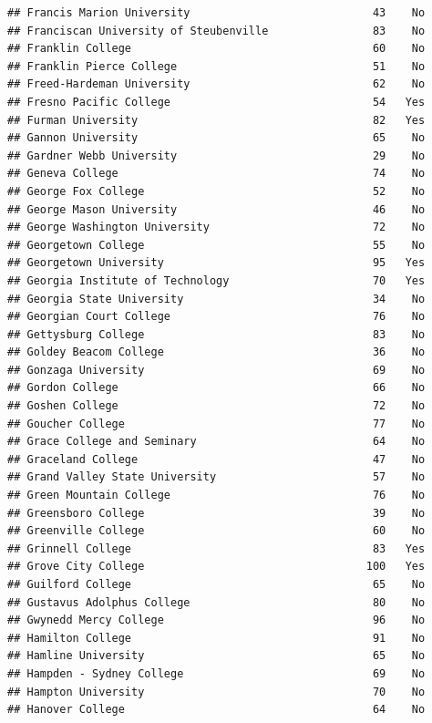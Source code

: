 \documentclass[
]{article}
\begin{document}
\begin{verbatim}
## Francis Marion University                            43    No
## Franciscan University of Steubenville                83    No
## Franklin College                                     60    No
## Franklin Pierce College                              51    No
## Freed-Hardeman University                            62    No
## Fresno Pacific College                               54   Yes
## Furman University                                    82   Yes
## Gannon University                                    65    No
## Gardner Webb University                              29    No
## Geneva College                                       74    No
## George Fox College                                   52    No
## George Mason University                              46    No
## George Washington University                         72    No
## Georgetown College                                   55    No
## Georgetown University                                95   Yes
## Georgia Institute of Technology                      70   Yes
## Georgia State University                             34    No
## Georgian Court College                               76    No
## Gettysburg College                                   83    No
## Goldey Beacom College                                36    No
## Gonzaga University                                   69    No
## Gordon College                                       66    No
## Goshen College                                       72    No
## Goucher College                                      77    No
## Grace College and Seminary                           64    No
## Graceland College                                    47    No
## Grand Valley State University                        57    No
## Green Mountain College                               76    No
## Greensboro College                                   39    No
## Greenville College                                   60    No
## Grinnell College                                     83   Yes
## Grove City College                                  100   Yes
## Guilford College                                     65    No
## Gustavus Adolphus College                            80    No
## Gwynedd Mercy College                                96    No
## Hamilton College                                     91    No
## Hamline University                                   65    No
## Hampden - Sydney College                             69    No
## Hampton University                                   70    No
## Hanover College                                      64    No

\end{verbatim}
\end{document}
